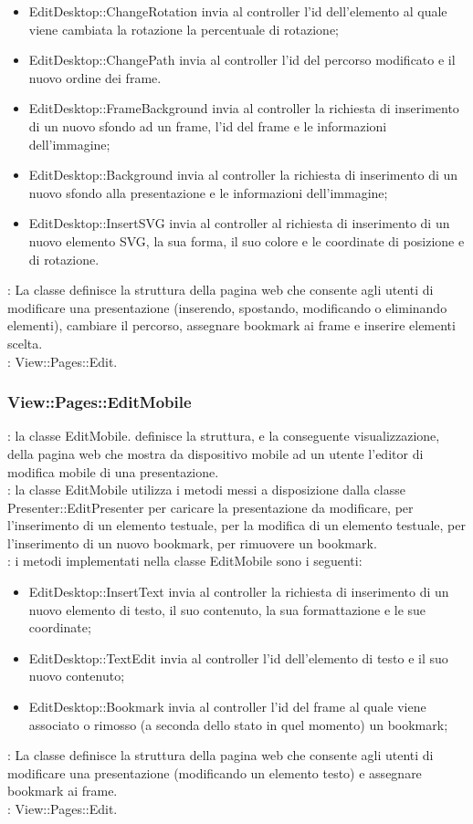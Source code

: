 {{{\begin{itemize}
				\item EditDesktop::ChangeRotation invia al controller l'id dell'elemento al quale viene cambiata la rotazione la percentuale di rotazione;
				\item EditDesktop::ChangePath invia al controller l'id del percorso modificato e il nuovo ordine dei frame.
				\item EditDesktop::FrameBackground invia al controller la richiesta di inserimento di un nuovo sfondo ad un frame, l'id del frame e le informazioni dell'immagine;
				\item EditDesktop::Background invia al controller la richiesta di inserimento di un nuovo sfondo alla presentazione e le informazioni dell'immagine;
				\item EditDesktop::InsertSVG invia al controller al richiesta di inserimento di un nuovo elemento SVG, la sua forma, il suo colore e le coordinate di posizione e di rotazione.
			\end{itemize}
			\textbf{\attivita}: La classe definisce la struttura della pagina web che consente agli utenti di modificare una presentazione (inserendo, spostando, modificando o eliminando elementi), cambiare il percorso, assegnare bookmark ai frame e inserire elementi scelta.\\
			\textbf{\base}: View::Pages::Edit.
		}
		\subsubsection{View::Pages::EditMobile}{
			\textbf{\tipo}: la classe EditMobile. definisce la struttura, e la conseguente visualizzazione, della pagina web che mostra  da dispositivo mobile ad un utente l'editor di modifica mobile di una presentazione. \\
			\textbf{\relaz}: la classe EditMobile utilizza i metodi messi a disposizione dalla classe Presenter::EditPresenter per caricare la presentazione da modificare, per l'inserimento di un elemento testuale, per la modifica di un elemento testuale, per l'inserimento di un nuovo bookmark, per rimuovere un bookmark.\\
		\textbf{\interfacce}: i metodi implementati nella classe EditMobile sono i seguenti:
		\begin{itemize}
			\item EditDesktop::InsertText invia al controller la richiesta di inserimento di un nuovo elemento di testo, il suo contenuto, la sua formattazione e le sue coordinate;
			\item EditDesktop::TextEdit invia al controller l'id dell'elemento di testo e il suo nuovo contenuto;
			\item EditDesktop::Bookmark invia al controller l'id del frame al quale viene associato o rimosso (a seconda dello stato in quel momento) un bookmark;
		\end{itemize}
			\textbf{\attivita}: La classe definisce la struttura della pagina web che consente agli utenti di modificare una presentazione (modificando un elemento testo) e assegnare bookmark ai frame.\\
			\textbf{\base}: View::Pages::Edit.
		}
}}

